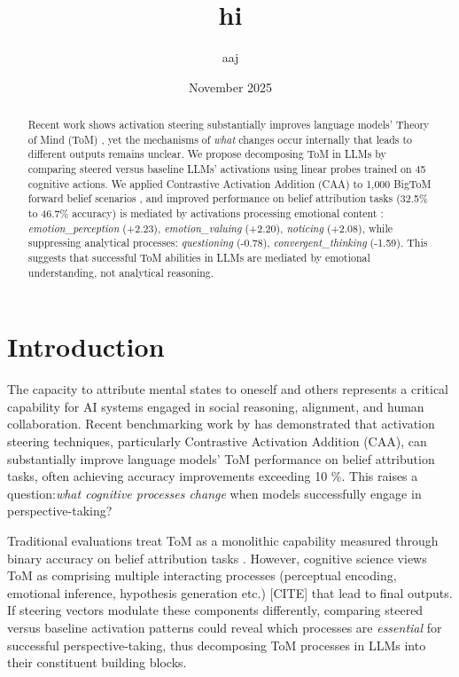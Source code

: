 \documentclass{article}
\title{hi}
\author{aaj }
\date{November 2025}
\begin{document}
\maketitle

\begin{abstract}
Recent work shows activation steering substantially improves language models' Theory of Mind (ToM) \cite{Bortoletto2024}, yet the mechanisms of \textit{what} changes occur internally that leads to different outputs remains unclear. We propose decomposing ToM in LLMs by comparing steered versus baseline LLMs' activations using linear probes trained on 45 cognitive actions. We applied Contrastive Activation Addition (CAA) to 1,000 BigToM forward belief scenarios \cite{gandhi2023understanding}, and improved performance on belief attribution tasks (32.5\% to 46.7\% accuracy) is mediated by activations processing emotional content : \textit{emotion\_perception} (+2.23), \textit{emotion\_valuing} (+2.20), \textit{noticing} (+2.08), while suppressing analytical processes: \textit{questioning} (-0.78), \textit{convergent\_thinking} (-1.59). This suggests that successful ToM abilities in LLMs are mediated by emotional understanding, not analytical reasoning.
\end{abstract}

\section{Introduction}

The capacity to attribute mental states to oneself and others represents a critical capability for AI systems engaged in social reasoning, alignment, and human collaboration. Recent benchmarking work by \citet{Bortoletto2024} has demonstrated that activation steering techniques, particularly Contrastive Activation Addition (CAA), can substantially improve language models' ToM performance on belief attribution tasks, often achieving accuracy improvements exceeding 10 \%. This raises a question:\textit{what cognitive processes change} when models successfully engage in perspective-taking?

Traditional evaluations treat ToM as a monolithic capability measured through binary accuracy on belief attribution tasks \cite{gandhi2023understanding}. However, cognitive science views ToM as comprising multiple interacting processes (perceptual encoding, emotional inference, hypothesis generation etc.) [CITE] that lead to final outputs. If steering vectors modulate these components differently, comparing steered versus baseline activation patterns could reveal which processes are \textit{essential} for successful perspective-taking, thus  decomposing ToM processes in LLMs into their constituent building blocks.
\end{document}

